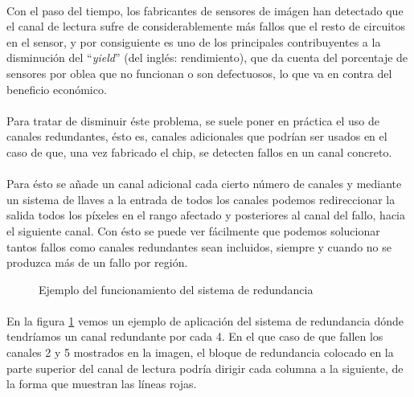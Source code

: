 \paragraph{}
Con el paso del tiempo, los fabricantes de sensores de imágen han detectado que
el canal de lectura sufre de considerablemente más fallos que el resto de circuitos
en el sensor, y por consiguiente es uno de los principales contribuyentes a la
disminución del ``\textit{yield}'' (del inglés: rendimiento), que da cuenta del
porcentaje de sensores por oblea que no funcionan o son defectuosos, lo que va
en contra del beneficio económico.

\paragraph{}
Para tratar de disminuir éste problema, se suele poner en práctica el uso de canales
redundantes, ésto es, canales adicionales que podrían ser usados en el caso de que,
una vez fabricado el chip, se detecten fallos en un canal concreto.

\paragraph{}
Para ésto se añade un canal adicional cada cierto número de canales y mediante un
sistema de llaves a la entrada de todos los canales podemos redireccionar la
salida todos los píxeles en el rango afectado y posteriores al canal del fallo,
hacia el siguiente canal. Con ésto se puede ver fácilmente que podemos solucionar
tantos fallos como canales redundantes sean incluidos, siempre y cuando no se
produzca más de un fallo por región.

\begin{figure}[h]
	
	\caption{Ejemplo del funcionamiento del sistema de redundancia}
	\label{fig:redundancy}
\end{figure}

\paragraph{}
En la figura \ref{fig:redundancy} vemos un ejemplo de aplicación del sistema de
redundancia dónde tendríamos un canal redundante por cada 4. En el que caso de que
fallen los canales 2 y 5 mostrados en la imagen, el bloque de redundancia colocado
en la parte superior del canal de lectura podría dirigir cada columna a la siguiente,
de la forma que muestran las líneas rojas.

